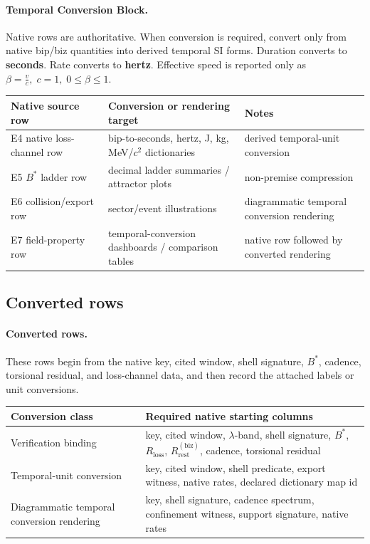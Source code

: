\paragraph{Temporal Conversion Block.} Native rows are authoritative. When conversion is required, convert only from native bip/biz quantities into derived temporal SI forms. Duration converts to \textbf{seconds}. Rate converts to \textbf{hertz}. Effective speed is reported only as $\beta=\frac{v}{c},\;c=1,\;0\le\beta\le1$.

\begin{center}
\begin{tabularx}{\linewidth}{@{}lXl@{}}
\toprule
Native source row & Conversion or rendering target & Notes \\
\midrule
E4 native loss-channel row & bip-to-seconds, hertz, J, kg, MeV/$c^2$ dictionaries & derived temporal-unit conversion \\
E5 $B^*$ ladder row & decimal ladder summaries / attractor plots & non-premise compression \\
E6 collision/export row & sector/event illustrations & diagrammatic temporal conversion rendering \\
E7 field-property row & temporal-conversion dashboards / comparison tables & native row followed by converted rendering \\
\bottomrule
\end{tabularx}
\end{center}

\subsection{Converted rows}\label{app:realworld-routing}
\paragraph{Converted rows.} These rows begin from the native key, cited window, shell signature, $B^*$, cadence, torsional residual, and loss-channel data, and then record the attached labels or unit conversions.

\begin{center}
\begin{tabularx}{\linewidth}{@{}lX@{}}
\toprule
Conversion class & Required native starting columns \\
\midrule
Verification binding & key, cited window, $\lambda$-band, shell signature, $B^*$, $R_{\mathrm{loss}}$, $R^{(\mathrm{biz})}_{\mathrm{rest}}$, cadence, torsional residual \\
Temporal-unit conversion & key, cited window, shell predicate, export witness, native rates, declared dictionary map id \\
Diagrammatic temporal conversion rendering & key, shell signature, cadence spectrum, confinement witness, support signature, native rates \\
\bottomrule
\end{tabularx}
\end{center}


